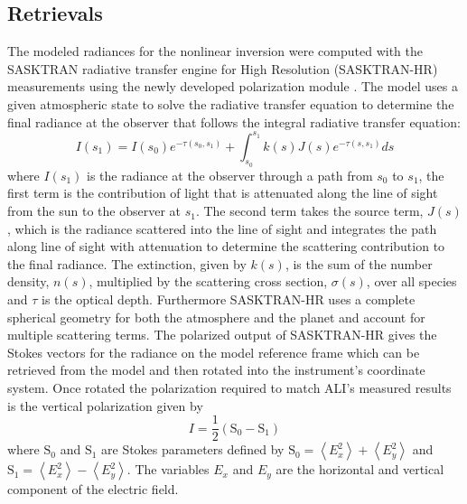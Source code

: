 \documentclass[12pt]{article}
\begin{document}

\subsection{Retrievals}
\label{sec:retrievals}

The modeled radiances for the nonlinear inversion were computed with the SASKTRAN radiative transfer engine \citep{Bourassa2008a} for High Resolution (SASKTRAN-HR) \citep{Zawada2015} measurements using the newly developed polarization module \citep{Dueck2015}. The model uses a given atmospheric state to solve the radiative transfer equation to determine the final radiance at the observer that follows the integral radiative transfer equation:
\begin{equation}
    I(s_{1}) = I(s_{0})e^{-\tau(s_{0}, s_{1})}+\int^{s_{1}}_{s_{0}}k(s)J(s)e^{-\tau(s, s_{1})}ds
\end{equation}
where $I(s_{1})$ is the radiance at the observer through a path from $s_{0}$ to $s_{1}$, the first term is the contribution of light that is attenuated along the line of sight from the sun to the observer at $s_{1}$. The second term takes the source term, $J(s)$, which is the radiance scattered into the line of sight and integrates the path along line of sight with attenuation to determine the scattering contribution to the final radiance. The extinction, given by $k(s)$, is the sum of the number density, $n(s)$, multiplied by the scattering cross section, $\sigma(s)$, over all species and $\tau$ is the optical depth. Furthermore SASKTRAN-HR uses a complete spherical geometry for both the atmosphere and the planet and account for multiple scattering terms. The polarized output of SASKTRAN-HR gives the Stokes vectors for the radiance on the model reference frame which can be retrieved from the model and then rotated into the instrument's coordinate system. Once rotated the polarization required to match ALI's measured results is the vertical polarization given by
\begin{equation}
    I = \frac{1}{2}\left(\mathrm{S_{0}}-\mathrm{S_{1}}\right)
\end{equation}
where $\mathrm{S_{0}}$ and $\mathrm{S_{1}}$ are Stokes parameters defined by $\mathrm{S_{0}} = \left<E_{x}^{2}\right> + \left<E_{y}^{2}\right>$ and $\mathrm{S_{1}} = \left<E_{x}^{2}\right> - \left<E_{y}^{2}\right>$. The variables $E_{x}$ and $E_{y}$ are the horizontal and vertical component of the electric field.
\end{document}
